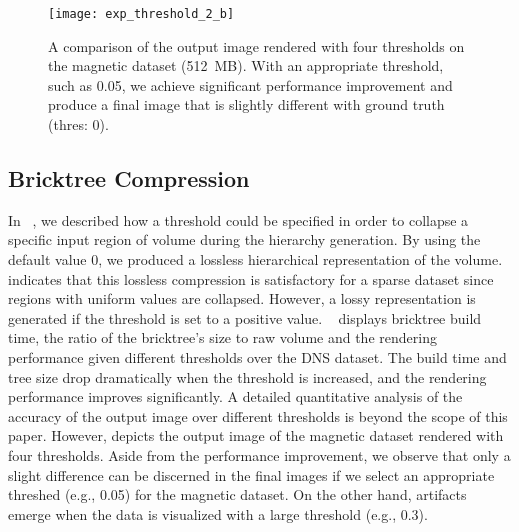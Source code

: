 \begin{figure*}[t]
    \centering
    \texttt{[image: exp\_threshold\_2\_b]}
	\caption{\label{fig:exp_threshold_2}%
	A comparison of the output image rendered with four thresholds on the magnetic dataset (512~MB).
	With an appropriate threshold, such as 0.05, we achieve significant performance improvement and produce a final image that is slightly different with ground truth (thres: 0).
	}
\end{figure*}

\subsection{Bricktree Compression}
In ~, we described how a threshold could be specified 
in order to collapse a specific input region of volume during the hierarchy generation.
By using the default value 0, we produced a lossless hierarchical representation of
the volume.  indicates that this lossless compression
is satisfactory for a sparse dataset since regions with uniform values
are collapsed. However, a lossy representation is generated if the threshold is
set to a positive value. ~ displays bricktree build time,
the ratio of the bricktree's size to raw volume and the rendering performance given different 
thresholds over the DNS dataset. The build time and tree size drop dramatically when 
the threshold is increased, and the rendering performance improves significantly. 
A detailed quantitative analysis of the accuracy of the output image over different 
thresholds is beyond the scope of this paper.
However, 
depicts the output image of the magnetic dataset rendered with four thresholds. Aside from the performance improvement, 
we observe that only a slight difference can be discerned in the final images if we select an appropriate threshed (e.g., 0.05) for the magnetic dataset.
On the other hand, artifacts emerge when the data is visualized with a large threshold (e.g., 0.3).

